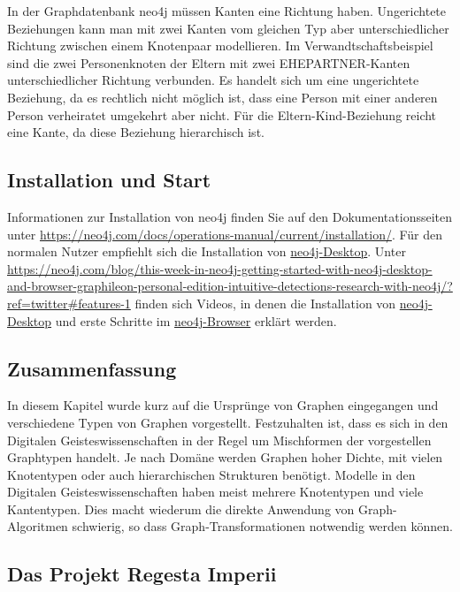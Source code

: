 In der Graphdatenbank neo4j müssen Kanten eine Richtung haben.
Ungerichtete Beziehungen kann man mit zwei Kanten vom gleichen Typ aber
unterschiedlicher Richtung zwischen einem Knotenpaar modellieren. Im
Verwandtschaftsbeispiel sind die zwei Personenknoten der Eltern mit zwei
EHEPARTNER-Kanten unterschiedlicher Richtung verbunden. Es handelt sich
um eine ungerichtete Beziehung, da es rechtlich nicht möglich ist, dass
eine Person mit einer anderen Person verheiratet umgekehrt aber nicht.
Für die Eltern-Kind-Beziehung reicht eine Kante, da diese Beziehung
hierarchisch ist.

\hypertarget{installation-und-start}{%
\subsection{Installation und Start}\label{installation-und-start}}

Informationen zur Installation von neo4j finden Sie auf den
Dokumentationsseiten unter
\url{https://neo4j.com/docs/operations-manual/current/installation/}.
Für den normalen Nutzer empfiehlt sich die Installation von
\href{https://neo4j.com/download/}{neo4j-Desktop}. Unter
\url{https://neo4j.com/blog/this-week-in-neo4j-getting-started-with-neo4j-desktop-and-browser-graphileon-personal-edition-intuitive-detections-research-with-neo4j/?ref=twitter\#features-1}
finden sich Videos, in denen die Installation von
\href{https://www.youtube.com/watch?v=8yWhuUnPapw}{neo4j-Desktop} und
erste Schritte im
\href{https://www.youtube.com/watch?v=rQTximyaETA}{neo4j-Browser}
erklärt werden.

\hypertarget{zusammenfassung}{%
\subsection{Zusammenfassung}\label{zusammenfassung}}

In diesem Kapitel wurde kurz auf die Ursprünge von Graphen eingegangen
und verschiedene Typen von Graphen vorgestellt. Festzuhalten ist, dass
es sich in den Digitalen Geisteswissenschaften in der Regel um
Mischformen der vorgestellen Graphtypen handelt. Je nach Domäne werden
Graphen hoher Dichte, mit vielen Knotentypen oder auch hierarchischen
Strukturen benötigt. Modelle in den Digitalen Geisteswissenschaften
haben meist mehrere Knotentypen und viele Kantentypen. Dies macht
wiederum die direkte Anwendung von Graph-Algoritmen schwierig, so dass
Graph-Transformationen notwendig werden können.

\hypertarget{das-projekt-regesta-imperii}{%
\subsection{Das Projekt Regesta
Imperii}\label{das-projekt-regesta-imperii}}

